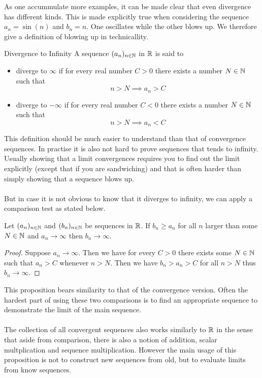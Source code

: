 \documentclass[a4paper]{article}
\begin{document}
As one accummulate more examples, it can be made clear that even divergence has different kinds. This is made explicitly true when considering the sequence $a_n=\sin(n)$ and $b_n=n$. One oscillates while the other blows up. We therefore give a definition of blowing up in technicallity. 

\begin{defn}{Divergence to Infinity}{} A sequence $(a_n)_{n\in\mathbb{N}}$ in $\mathbb{R}$ is said to 
\begin{itemize}
\item diverge to $\infty$ if for every real number $C>0$ there exists a number $N\in\mathbb{N}$ such that $$n>N\implies a_n>C$$
\item diverge to $-\infty$ if for every real number $C<0$ there exists a number $N\in\mathbb{N}$ such that $$n>N\implies a_n<C$$
\end{itemize}
\end{defn}

This definition should be much easier to understand than that of convergence sequences. In practise it is also not hard to prove sequences that tends to infinity. Usually showing that a limit convergences requires you to find out the limit explicitly (except that if you are sandwiching) and that is often harder than simply showing that a sequence blows up. \\~\\
But in case it is not obvious to know that it diverges to infinity, we can apply a comparison test as stated below. 

\begin{prp}{}{} Let $(a_n)_{n\in\mathbb{N}}$ and $(b_n)_{n\in\mathbb{N}}$ be sequences in $\mathbb{R}$. If $b_n\geq a_n$ for all $n$ larger than some $N\in\mathbb{N}$ and $a_n\to\infty$ then $b_n\to\infty$. \tcbline
\begin{proof} Suppose $a_n\to\infty$. Then we have for every $C>0$ there exists some $N\in\mathbb{N}$ such that $a_n>C$ whenever $n>N$. Then we have $b_n>a_n>C$ for all $n>N$ thus $b_n\to\infty$. 
\end{proof}
\end{prp}

This proposition bears similarity to that of the convergence version. Often the hardest part of using these two comparisons is to find an appropriate sequence to demonstrate the limit of the main sequence. \\~\\

The collection of all convergent sequences also works similarly to $\mathbb{R}$ in the sense that aside from comparison, there is also a notion of addition, scalar multplication and sequence multiplication. However the main usage of this proposition is not to construct new sequences from old, but to evaluate limits from know sequences. 
\end{document}
